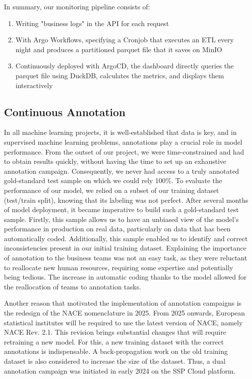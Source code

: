 In summary, our monitoring pipeline consists of:

\begin{enumerate}
    \item Writing "business logs" in the API for each request
    \item With Argo Workflows, specifying a Cronjob that executes an ETL every night and produces a partitioned parquet file that it saves on MinIO
    \item Continuously deployed with ArgoCD, the dashboard directly queries the parquet file using DuckDB, calculates the metrics, and displays them interactively
\end{enumerate}


\subsection{Continuous Annotation}

In all machine learning projects, it is well-established that data is key, and in supervised machine learning problems, annotations play a crucial role in model performance. From the outset of our project, we were time-constrained and had to obtain results quickly, without having the time to set up an exhaustive annotation campaign. Consequently, we never had access to a truly annotated gold-standard test sample on which we could rely 100\%. To evaluate the performance of our model, we relied on a subset of our training dataset (test/train split), knowing that its labeling was not perfect. After several months of model deployment, it became imperative to build such a gold-standard test sample. Firstly, this sample allows us to have an unbiased view of the model's performance in production on real data, particularly on data that has been automatically coded. Additionally, this sample enabled us to identify and correct inconsistencies present in our initial training dataset. Explaining the importance of annotation to the business teams was not an easy task, as they were reluctant to reallocate new human resources, requiring some expertise and potentially being tedious. The increase in automatic coding thanks to the model allowed for the reallocation of teams to annotation tasks.

Another reason that motivated the implementation of annotation campaigns is the redesign of the NACE nomenclature in 2025. From 2025 onwards, European statistical institutes will be required to use the latest version of NACE, namely NACE Rev. 2.1. This revision brings substantial changes that will require retraining a new model. For this, a new training dataset with the correct annotations is indispensable. A back-propagation work on the old training dataset is also considered to increase the size of the dataset. Thus, a dual annotation campaign was initiated in early 2024 on the SSP Cloud platform.

